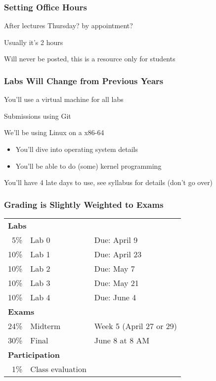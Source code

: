   \begin{frame}
    \frametitle{Setting Office Hours}

    After lectures Thursday? by appointment?

    \vspace{2em}

    Usually it's 2 hours

    \vspace{2em}

    Will never be posted, this is a resource only for students
  \end{frame}

  \begin{frame}
    \frametitle{Labs Will Change from Previous Years}

    You'll use a virtual machine for all labs

    \vspace{2em}

    Submissions using Git

    \vspace{2em}

    We'll be using Linux on a x86-64

    \begin{itemize}
      \item You'll dive into operating system details
      \item You'll be able to do (some) kernel programming
    \end{itemize}

    \vspace{2em}

    You'll have 4 late days to use, see syllabus for details (don't go over)
  \end{frame}

  \begin{frame}
    \frametitle{Grading is Slightly Weighted to Exams}

    \begin{tabular}{rll}
      \multicolumn{2}{l}{\bfseries Labs} \\
       5\% & Lab 0 & Due: April 9 \\
      10\% & Lab 1 & Due: April 23 \\
      10\% & Lab 2 & Due: May 7 \\
      10\% & Lab 3 & Due: May 21\\
      10\% & Lab 4 & Due: June 4 \\
      \multicolumn{2}{l}{\bfseries Exams} \\
      24\% & Midterm & Week 5 (April 27 or 29) \\
      30\% & Final & June 8 at 8 AM\\
      \multicolumn{2}{l}{\bfseries Participation} \\
       1\% & Class evaluation \\
    \end{tabular}
  \end{frame}

